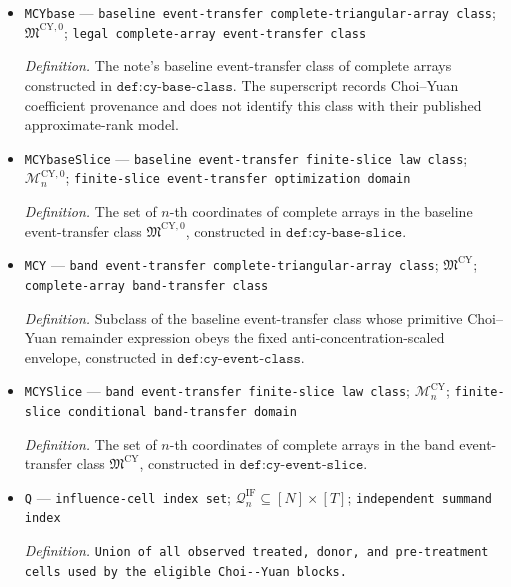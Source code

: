 \documentclass{article}
\begin{document}
\begin{itemize}
  \item \texttt{MCYbase} --- \texttt{baseline event-\allowbreak{}transfer complete-\allowbreak{}triangular-\allowbreak{}array class}; \(\mathfrak M^{\mathrm{CY},0}\); \texttt{legal complete-\allowbreak{}array event-\allowbreak{}transfer class}
  \par\smallskip\noindent\emph{Definition.} The note's baseline event-transfer class of complete arrays constructed in \(\texttt{def:cy-base-class}\).  The superscript records Choi--Yuan coefficient provenance and does not identify this class with their published approximate-rank model.
  \item \texttt{MCYbaseSlice} --- \texttt{baseline event-\allowbreak{}transfer finite-\allowbreak{}slice law class}; \(\mathcal M_n^{\mathrm{CY},0}\); \texttt{finite-\allowbreak{}slice event-\allowbreak{}transfer optimization domain}
  \par\smallskip\noindent\emph{Definition.} The set of \(n\)-th coordinates of complete arrays in the baseline event-transfer class \(\mathfrak M^{\mathrm{CY},0}\), constructed in \(\texttt{def:cy-base-slice}\).
  \item \texttt{MCY} --- \texttt{band event-\allowbreak{}transfer complete-\allowbreak{}triangular-\allowbreak{}array class}; \(\mathfrak M^{\mathrm{CY}}\); \texttt{complete-\allowbreak{}array band-\allowbreak{}transfer class}
  \par\smallskip\noindent\emph{Definition.} Subclass of the baseline event-transfer class whose primitive Choi--Yuan remainder expression obeys the fixed anti-concentration-scaled envelope, constructed in \(\texttt{def:cy-event-class}\).
  \item \texttt{MCYSlice} --- \texttt{band event-\allowbreak{}transfer finite-\allowbreak{}slice law class}; \(\mathcal M_n^{\mathrm{CY}}\); \texttt{finite-\allowbreak{}slice conditional band-\allowbreak{}transfer domain}
  \par\smallskip\noindent\emph{Definition.} The set of \(n\)-th coordinates of complete arrays in the band event-transfer class \(\mathfrak M^{\mathrm{CY}}\), constructed in \(\texttt{def:cy-event-slice}\).
  \item \texttt{Q} --- \texttt{influence-\allowbreak{}cell index set}; \(\mathcal Q_n^{\mathrm{IF}}\subseteq[N]\times[T]\); \texttt{independent summand index}
  \par\smallskip\noindent\emph{Definition.} \texttt{Union of all observed treated,\allowbreak{} donor,\allowbreak{} and pre-\allowbreak{}treatment cells used by the eligible Choi-\allowbreak{}-\allowbreak{}Yuan blocks.}

\end{itemize}
\end{document}

